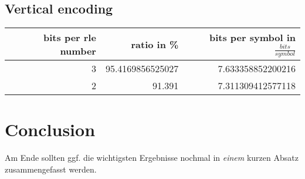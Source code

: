\subsection{Vertical encoding}
\par{

\begin{center}
	\begin{tabular}[p]{r|r|r}
		\label{tab:t7 rle vertical reading}
		
		bits per rle number & ratio in \% & bits per symbol in $\frac{bits}{symbol}$\\
		\hline
		3 & 95.4169856525027 & 7.633358852200216\\
		2 & 91.391 & 7.311309412577118 \\
	\end{tabular}
\end{center}

}

\section{Conclusion}
\label{ch:Evaluation:sec:Conclusion}

Am Ende sollten ggf. die wichtigsten Ergebnisse nochmal in \emph{einem} kurzen Absatz zusammengefasst werden.


